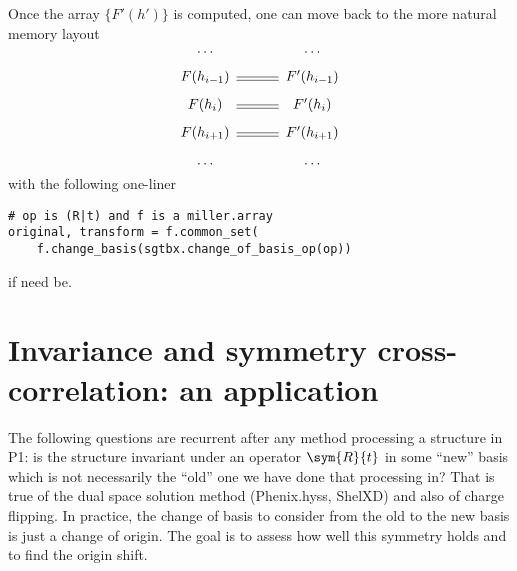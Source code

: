 \documentclass[11pt]{article}
\begin{document}
Once the array $\{F'(h')\}$ is computed, one can move back to the more natural memory layout
\begin{equation}
\begin{CD}
\ldots @. \ldots\\
F(h_{i-1}) @= F'(h_{i-1})\\
F(h_i) @= F'(h_i)\\
F(h_{i+1}) @= F'(h_{i+1})\\
\ldots @. \ldots
\end{CD}
\label{eqn:miller::array::transform}
\end{equation}
with the following one-liner
\begin{lstlisting}
# op is (R|t) and f is a miller.array
original, transform = f.common_set(
	f.change_basis(sgtbx.change_of_basis_op(op))
\end{lstlisting}
if need be.

\section{Invariance and symmetry cross-correlation: an application}

The following questions are recurrent after any method processing a structure in P1: is the structure invariant under an operator $\sym{R}{t}$ in some ``new'' basis which is not necessarily the ``old'' one we have done that processing in? That is true of the dual space solution method (Phenix.hyss, ShelXD) and also of charge flipping. In practice, the change of basis to consider from the old to the new basis is just a change of origin. The goal is to assess how well this symmetry holds and to find the origin shift.
\end{document}

